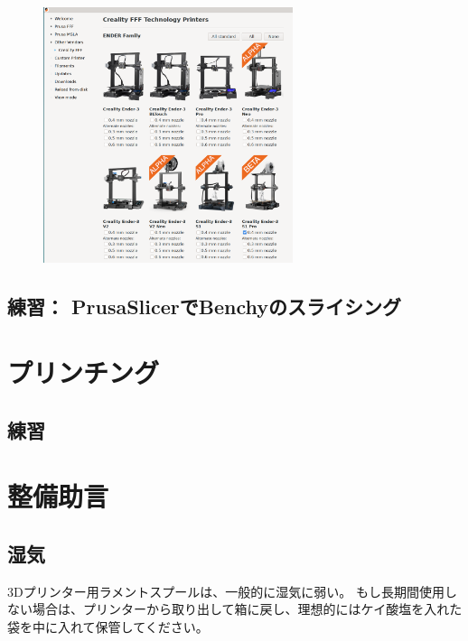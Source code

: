 \documentclass[10pt,a4paper,onecolumn,notitlepage,oneside,dvipdfmx]{article}
\begin{document}
\begin{figure}[htbp]
\centering
\includegraphics[width=0.65\textwidth]{img/ender3_beta.png}
\end{figure}


\subsection{練習： PrusaSlicerでBenchyのスライシング}
\label{sec:org5f27ca7}

\pagebreak
\section{プリンチング}
\label{sec:org97d3533}
\subsection{練習}
\label{sec:orgdda8364}

\pagebreak
\section{整備助言}
\label{sec:org0330aeb}

\subsection{湿気}
\label{sec:org4430e5c}
3Dプリンター用ラメントスプールは、一般的に湿気に弱い。
もし長期間使用しない場合は、プリンターから取り出して箱に戻し、理想的にはケイ酸塩を入れた袋を中に入れて保管してください。
\end{document}
